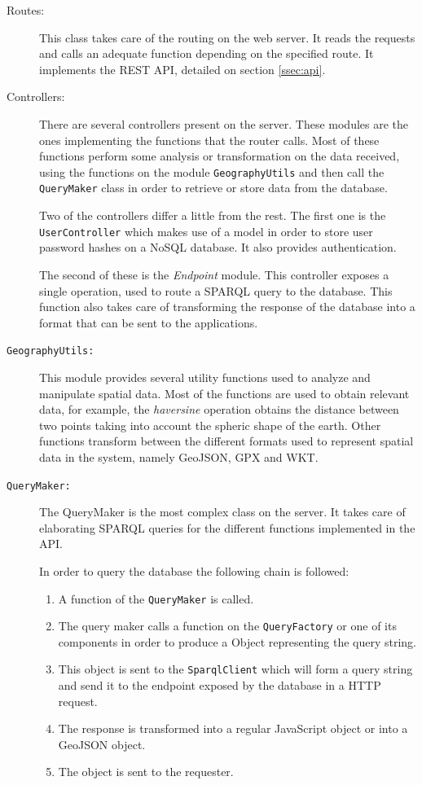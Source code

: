 \begin{description}
\item[Routes:] This class takes care of the routing on the web server. It reads the requests and calls an adequate function depending on the specified route. It implements the REST API, detailed on section \ref{ssec:api}.

\item[Controllers:] There are several controllers present on the server. These modules are the ones implementing the functions that the router calls. Most of these functions perform some analysis or transformation on the data received, using the functions on the module \texttt{GeographyUtils} and then call the \texttt{QueryMaker} class in order to retrieve or store data from the database.

Two of the controllers differ a little from the rest. The first one is the \texttt{UserController} which makes use of a model in order to store user password hashes on a NoSQL database. It also provides authentication.

The second of these is the \textit{Endpoint} module. This controller exposes a single operation, used to route a SPARQL query to the database. This function also takes care of transforming the response of the database into a format that can be sent to the applications.

\item[\texttt{GeographyUtils:}] This module provides several utility functions used to analyze and manipulate spatial data. Most of the functions are used to obtain relevant data, for example, the \textit{haversine} operation obtains the distance between two points taking into account the spheric shape of the earth. Other functions transform between the different formats used to represent spatial data in the system, namely GeoJSON, GPX and WKT.

\item[\texttt{QueryMaker:}] The QueryMaker is the most complex class on the server. It takes care of elaborating SPARQL queries for the different functions implemented in the API.

In order to query the database the following chain is followed:

\begin{enumerate}
\item A function of the \texttt{QueryMaker} is called.
\item The query maker calls a function on the \texttt{QueryFactory} or one of its components in order to produce a Object representing the query string.
\item This object is sent to the \texttt{SparqlClient} which will form a query string and send it to the endpoint exposed by the database in a HTTP request.
\item The response is transformed into a regular JavaScript object or into a GeoJSON object.
\item The object is sent to the requester.
\end{enumerate}


\end{description}
